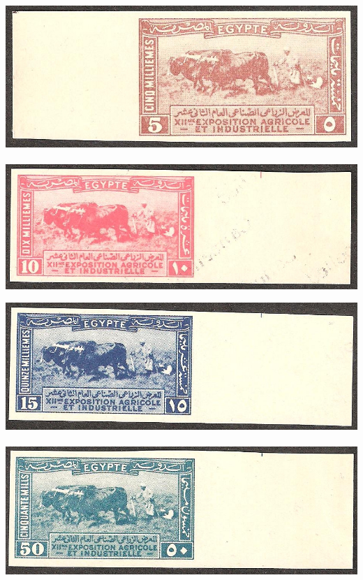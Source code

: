 \documentclass[justified]{tufte-book}
\begin{document}
\begin{fullwidth}
\hbox{\includegraphics[scale=1.1]{./graphics/EG/SG126-cancelled} \includegraphics[scale=1.1]{./graphics/EG/SG127-cancelled}}

\bigskip
\hbox{\includegraphics[scale=1.1]{./graphics/EG/SG128-cancelled}  \includegraphics[scale=1.1]{./graphics/EG/SG129-cancelled}}
\bigskip


\end{fullwidth}
\end{document}
